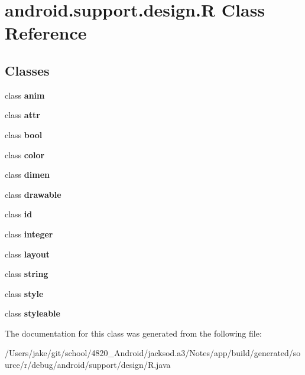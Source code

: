 \hypertarget{classandroid_1_1support_1_1design_1_1_r}{}\section{android.\+support.\+design.\+R Class Reference}
\label{classandroid_1_1support_1_1design_1_1_r}
\subsection*{Classes}
\begin{DoxyCompactItemize}
\item 
class {\bfseries anim}
\item 
class {\bfseries attr}
\item 
class {\bfseries bool}
\item 
class {\bfseries color}
\item 
class {\bfseries dimen}
\item 
class {\bfseries drawable}
\item 
class {\bfseries id}
\item 
class {\bfseries integer}
\item 
class {\bfseries layout}
\item 
class {\bfseries string}
\item 
class {\bfseries style}
\item 
class {\bfseries styleable}
\end{DoxyCompactItemize}


The documentation for this class was generated from the following file\+:\begin{DoxyCompactItemize}
\item 
/\+Users/jake/git/school/4820\+\_\+\+Android/jacksod.\+a3/\+Notes/app/build/generated/source/r/debug/android/support/design/R.\+java\end{DoxyCompactItemize}
